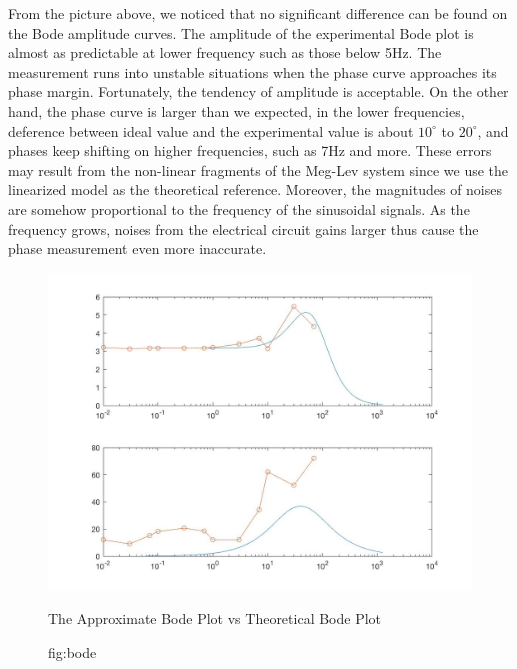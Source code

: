 \documentclass[letterpaper]{article}
\begin{document}
From the picture above, we noticed that no significant difference can be found on the Bode amplitude curves. The amplitude of the experimental Bode plot is almost as predictable at lower frequency such as those below 5Hz. The measurement runs into unstable situations when the phase curve approaches its phase margin. Fortunately, the tendency of amplitude is acceptable.
On the other hand, the phase curve is larger than we expected, in the lower frequencies, deference between ideal value and the experimental value is about $10^{\circ}$ to $20^{\circ}$, and phases keep shifting on higher frequencies, such as 7Hz and more. These errors may result from the non-linear fragments of the Meg-Lev system since we use the linearized model as the theoretical reference. Moreover, the magnitudes of noises are somehow proportional to the frequency of the sinusoidal signals. As the frequency grows, noises from the electrical circuit gains larger thus cause the phase measurement even more inaccurate.
\begin{figure}[H]
	\centering
	\includegraphics[scale=0.36]{bode.jpg}
	\caption{The Approximate Bode Plot vs Theoretical Bode Plot}
	\caption{fig:bode}
\end{figure}
\end{document}
